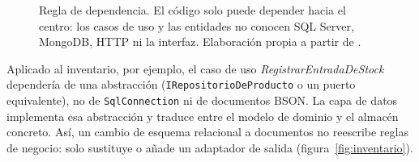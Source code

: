 \begin{figure}[H]
  \caption{Regla de dependencia. El código solo puede depender hacia el centro: los casos de uso y las entidades no conocen SQL Server, MongoDB, HTTP ni la interfaz. Elaboración propia a partir de \parencite{martin2017clean}.}
  \label{fig:anillos}
\end{figure}

Aplicado al inventario, por ejemplo, el caso de uso \emph{RegistrarEntradaDeStock} dependería de una abstracción
(\texttt{IRepositorioDeProducto} o un puerto equivalente), no de \texttt{SqlConnection} ni de
documentos BSON. La capa de datos implementa esa abstracción y traduce entre el modelo de dominio y
el almacén concreto. Así, un cambio de esquema relacional a documentos no reescribe reglas de
negocio: solo sustituye o añade un adaptador de salida (figura~\ref{fig:inventario}).

